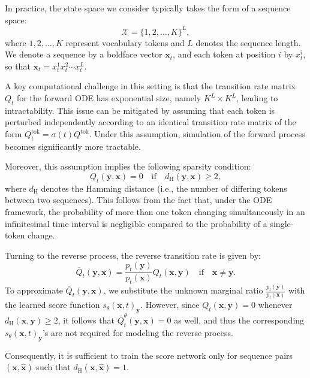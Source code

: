 \documentclass[11pt, a4paper]{article}
\begin{document}
In practice, the state space we consider typically takes the form of a sequence space:
\[
\mathcal{X} = \{1, 2, \ldots, K\}^L,
\]
where \(1, 2, \ldots, K\) represent vocabulary tokens and \(L\) denotes the sequence length.  
We denote a sequence by a boldface vector \(\mathbf{x}_t\), and each token at position \(i\) by \(x_t^i\), so that \(\mathbf{x}_t = x_t^1 x_t^2 \cdots x_t^L\).

A key computational challenge in this setting is that the transition rate matrix \(Q_t\) for the forward ODE has exponential size, namely \(K^L \times K^L\), leading to intractability.  
This issue can be mitigated by assuming that each token is perturbed independently according to an identical transition rate matrix of the form \(Q_t^\text{tok} = \sigma(t) Q^\text{tok}\).  
Under this assumption, simulation of the forward process becomes significantly more tractable.

Moreover, this assumption implies the following sparsity condition:
\[
Q_t(\mathbf{y}, \mathbf{x}) = 0 \quad \text{if} \quad d_\text{H}(\mathbf{y}, \mathbf{x}) \geq 2,
\]
where \(d_\text{H}\) denotes the Hamming distance (i.e., the number of differing tokens between two sequences).  
This follows from the fact that, under the ODE framework, the probability of more than one token changing simultaneously in an infinitesimal time interval is negligible compared to the probability of a single-token change.

Turning to the reverse process, the reverse transition rate is given by:
\[
\overline{Q}_t(\mathbf{y}, \mathbf{x}) = \frac{p_t(\mathbf{y})}{p_t(\mathbf{x})} Q_t(\mathbf{x}, \mathbf{y}) \quad \text{if} \quad \mathbf{x} \neq \mathbf{y}.
\]
To approximate \(\overline{Q}_t(\mathbf{y}, \mathbf{x})\), we substitute the unknown marginal ratio \(\frac{p_t(\mathbf{y})}{p_t(\mathbf{x})}\) with the learned score function \(s_\theta(\mathbf{x}, t)_{\mathbf{y}}\).  
However, since \(Q_t(\mathbf{x}, \mathbf{y}) = 0\) whenever \(d_\text{H}(\mathbf{x}, \mathbf{y}) \geq 2\), it follows that \(\overline{Q}^\theta_t(\mathbf{y}, \mathbf{x}) = 0\) as well, and thus the corresponding \(s_\theta(\mathbf{x}, t)_{\mathbf{y}}\)'s are not required for modeling the reverse process.

Consequently, it is sufficient to train the score network only for sequence pairs \((\mathbf{x}, \hat{\mathbf{x}})\) such that \(d_\text{H}(\mathbf{x}, \hat{\mathbf{x}}) = 1\).



{\small


% 
}
\end{document}
